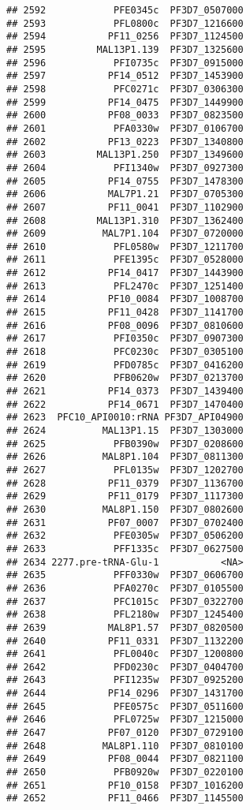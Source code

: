 \documentclass[12pt, a4paper]{article}\usepackage[]{graphicx}\usepackage[]{color}
\makeatletter
\newenvironment{kframe}{%
 \def\at@end@of@kframe{}%
 \ifinner\ifhmode%
  \def\at@end@of@kframe{\end{minipage}}%
  \begin{minipage}{\columnwidth}%
 \fi\fi%
 \def\FrameCommand##1{\hskip\@totalleftmargin \hskip-\fboxsep
 \colorbox{shadecolor}{##1}\hskip-\fboxsep
     \hskip-\linewidth \hskip-\@totalleftmargin \hskip\columnwidth}%
 \MakeFramed {\advance\hsize-\width
   \@totalleftmargin\z@ \linewidth\hsize
   \@setminipage}}%
 {\par\unskip\endMakeFramed%
 \at@end@of@kframe}
\newenvironment{knitrout}{}{} %
\makeatother
\begin{document}
\begin{knitrout}
\begin{kframe}
\begin{verbatim}
## 2592            PFE0345c  PF3D7_0507000
## 2593            PFL0800c  PF3D7_1216600
## 2594           PF11_0256  PF3D7_1124500
## 2595         MAL13P1.139  PF3D7_1325600
## 2596            PFI0735c  PF3D7_0915000
## 2597           PF14_0512  PF3D7_1453900
## 2598            PFC0271c  PF3D7_0306300
## 2599           PF14_0475  PF3D7_1449900
## 2600           PF08_0033  PF3D7_0823500
## 2601            PFA0330w  PF3D7_0106700
## 2602           PF13_0223  PF3D7_1340800
## 2603         MAL13P1.250  PF3D7_1349600
## 2604            PFI1340w  PF3D7_0927300
## 2605           PF14_0755  PF3D7_1478300
## 2606           MAL7P1.21  PF3D7_0705300
## 2607           PF11_0041  PF3D7_1102900
## 2608         MAL13P1.310  PF3D7_1362400
## 2609          MAL7P1.104  PF3D7_0720000
## 2610            PFL0580w  PF3D7_1211700
## 2611            PFE1395c  PF3D7_0528000
## 2612           PF14_0417  PF3D7_1443900
## 2613            PFL2470c  PF3D7_1251400
## 2614           PF10_0084  PF3D7_1008700
## 2615           PF11_0428  PF3D7_1141700
## 2616           PF08_0096  PF3D7_0810600
## 2617            PFI0350c  PF3D7_0907300
## 2618            PFC0230c  PF3D7_0305100
## 2619            PFD0785c  PF3D7_0416200
## 2620            PFB0620w  PF3D7_0213700
## 2621           PF14_0373  PF3D7_1439400
## 2622           PF14_0671  PF3D7_1470400
## 2623  PFC10_API0010:rRNA PF3D7_API04900
## 2624          MAL13P1.15  PF3D7_1303000
## 2625            PFB0390w  PF3D7_0208600
## 2626          MAL8P1.104  PF3D7_0811300
## 2627            PFL0135w  PF3D7_1202700
## 2628           PF11_0379  PF3D7_1136700
## 2629           PF11_0179  PF3D7_1117300
## 2630          MAL8P1.150  PF3D7_0802600
## 2631           PF07_0007  PF3D7_0702400
## 2632            PFE0305w  PF3D7_0506200
## 2633            PFF1335c  PF3D7_0627500
## 2634 2277.pre-tRNA-Glu-1           <NA>
## 2635            PFF0330w  PF3D7_0606700
## 2636            PFA0270c  PF3D7_0105500
## 2637            PFC1015c  PF3D7_0322700
## 2638            PFL2180w  PF3D7_1245400
## 2639           MAL8P1.57  PF3D7_0820500
## 2640           PF11_0331  PF3D7_1132200
## 2641            PFL0040c  PF3D7_1200800
## 2642            PFD0230c  PF3D7_0404700
## 2643            PFI1235w  PF3D7_0925200
## 2644           PF14_0296  PF3D7_1431700
## 2645            PFE0575c  PF3D7_0511600
## 2646            PFL0725w  PF3D7_1215000
## 2647           PF07_0120  PF3D7_0729100
## 2648          MAL8P1.110  PF3D7_0810100
## 2649           PF08_0044  PF3D7_0821100
## 2650            PFB0920w  PF3D7_0220100
## 2651           PF10_0158  PF3D7_1016200
## 2652           PF11_0466  PF3D7_1145500

\end{verbatim}
\end{kframe}
\end{knitrout}
\end{document}
